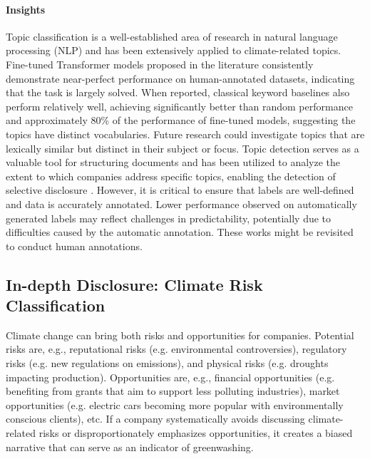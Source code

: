 \paragraph{Insights} Topic classification is a well-established area of research in natural language processing (NLP) and has been extensively applied to climate-related topics. Fine-tuned Transformer models proposed in the literature consistently demonstrate near-perfect performance on human-annotated datasets, indicating that the task is largely solved. When reported, classical keyword baselines also perform relatively well, achieving significantly better than random performance and approximately 80\%  of the performance of fine-tuned models, suggesting the topics have distinct vocabularies. Future research could investigate topics that are lexically similar but distinct in their subject or focus.
Topic detection serves as a valuable tool for structuring documents and has been utilized to analyze the extent to which companies address specific topics, enabling the detection of selective disclosure \cite{bingler2023cheaptalkspecificitysentiment, bingler_cheap_2021}. However, it is critical to ensure that labels are well-defined and data is accurately annotated. 
Lower performance observed on automatically generated labels may reflect challenges in predictability, potentially due to difficulties caused by the automatic annotation. These works might be revisited to conduct human annotations. 

\subsection{In-depth Disclosure: Climate Risk Classification}
\label{sec: climate risk}


Climate change can bring both risks and opportunities for companies. Potential risks are, e.g., reputational risks (e.g. environmental controversies), regulatory risks (e.g. new regulations on emissions), and physical risks (e.g. droughts impacting production).  Opportunities are, e.g., financial opportunities (e.g. benefiting from grants that aim to support less polluting industries), market opportunities (e.g. electric cars becoming more popular with environmentally conscious clients), etc. If a company systematically avoids discussing climate-related risks or disproportionately emphasizes opportunities, it creates a biased narrative that can serve as an indicator of greenwashing.

